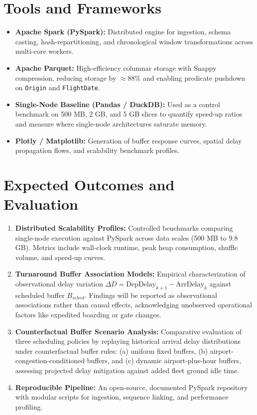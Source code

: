 \documentclass{article}
\begin{document}
\section{Tools and Frameworks}
\begin{itemize}
    \item \textbf{Apache Spark (PySpark):} Distributed engine for ingestion, schema casting, hash-repartitioning, and chronological window transformations across multi-core workers.
    \item \textbf{Apache Parquet:} High-efficiency columnar storage with Snappy compression, reducing storage by $\approx 88\%$ and enabling predicate pushdown on \texttt{Origin} and \texttt{FlightDate}.
    \item \textbf{Single-Node Baseline (Pandas / DuckDB):} Used as a control benchmark on 500 MB, 2 GB, and 5 GB slices to quantify speed-up ratios and measure where single-node architectures saturate memory.
    \item \textbf{Plotly / Matplotlib:} Generation of buffer response curves, spatial delay propagation flows, and scalability benchmark profiles.
\end{itemize}

\section{Expected Outcomes and Evaluation}
\begin{enumerate}
    \item \textbf{Distributed Scalability Profiles:} Controlled benchmarks comparing single-node execution against PySpark across data scales (500 MB to 9.8 GB). Metrics include wall-clock runtime, peak heap consumption, shuffle volume, and speed-up curves.
    \item \textbf{Turnaround Buffer Association Models:} Empirical characterization of observational delay variation $\Delta D = \text{DepDelay}_{k+1} - \text{ArrDelay}_k$ against scheduled buffer $B_{sched}$. Findings will be reported as observational associations rather than causal effects, acknowledging unobserved operational factors like expedited boarding or gate changes.
    \item \textbf{Counterfactual Buffer Scenario Analysis:} Comparative evaluation of three scheduling policies by replaying historical arrival delay distributions under counterfactual buffer rules: (a) uniform fixed buffers, (b) airport-congestion-conditioned buffers, and (c) dynamic airport-plus-hour buffers, assessing projected delay mitigation against added fleet ground idle time.
    \item \textbf{Reproducible Pipeline:} An open-source, documented PySpark repository with modular scripts for ingestion, sequence linking, and performance profiling.
\end{enumerate}
\end{document}
